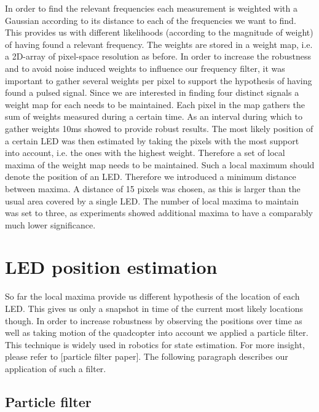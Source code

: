 In order to find the relevant frequencies each measurement is weighted with a Gaussian according to its distance to each of the frequencies we want to find. 
This provides us with different likelihoods (according to the magnitude of weight) of having found a relevant frequency. The weights are stored in a weight map, i.e. a 2D-array of pixel-space resolution as before. In order to increase the robustness and to avoid noise induced weights to influence our frequency filter, it was important to gather several weights per pixel to support the hypothesis of having found a pulsed signal. Since we are interested in finding four distinct signals a weight map for each needs to be maintained. Each pixel in the map gathers the sum of weights measured during a certain time. As an interval during which to gather weights 10ms showed to provide robust results. The most likely position of a certain LED was then estimated by taking the pixels with the most support into account, i.e. the ones with the highest weight.  Therefore a set of local maxima of the weight map needs to be maintained. Such a local maximum should denote the position of an LED. Therefore we introduced a minimum distance between maxima. A distance of 15 pixels was chosen, as this is larger than the usual area covered by a single LED. The number of local maxima to maintain was set to three, as experiments showed additional maxima to have a comparably much lower significance.

\section{LED position estimation}\label{sec:positionestimation}

So far the local maxima provide us different hypothesis of the location of each LED. This gives us only a snapshot in time of the current most likely locations though. In order to increase robustness by observing the positions over time as well as taking motion of the quadcopter into account we applied a particle filter. This technique is widely used in robotics for state estimation. For more insight, please refer to [particle filter paper]. The following paragraph describes our application of such a filter.


\subsection{Particle filter}\label{sec:particlefilter}

